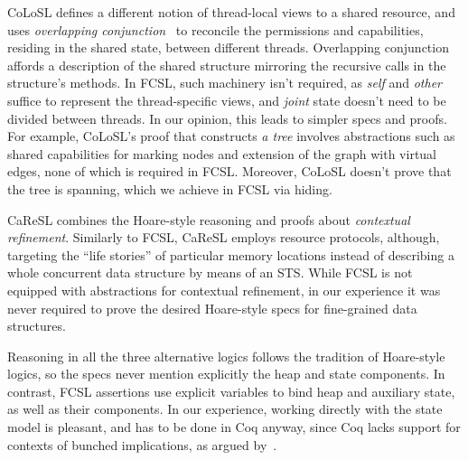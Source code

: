 CoLoSL defines a different notion of thread-local views to a shared
resource, and uses \emph{overlapping
  conjunction}~\cite{Hobor-Villard:POPL13} to reconcile the
permissions and capabilities, residing in the shared state, between
different threads.
%
Overlapping conjunction affords a description of the shared structure
mirroring the recursive calls in the structure's methods. In FCSL,
such machinery isn't required, as \emph{self} and \emph{other} suffice
to represent the thread-specific views, and \emph{joint} state doesn't
need to be divided between threads.
%
In our opinion, this leads to simpler specs and proofs. For example,
CoLoSL's proof that  constructs \emph{a tree} involves
abstractions such as shared capabilities for marking nodes and
extension of the graph with virtual edges, none of which is required
in FCSL. Moreover, CoLoSL doesn't prove that the tree is spanning,
which we achieve in FCSL via hiding.


CaReSL combines the Hoare-style reasoning and proofs about
\emph{contextual refinement}.  Similarly to FCSL, CaReSL employs
resource protocols, although, targeting the ``life stories'' of
particular memory locations instead of describing a whole concurrent
data structure by means of an STS.  While FCSL is not equipped with
abstractions for contextual refinement, in our experience it was never
required to prove the desired Hoare-style specs for fine-grained data
structures.

Reasoning in all the three alternative logics follows the tradition of
Hoare-style logics,
%
%
so the specs never mention explicitly the heap and state
components. In contrast, FCSL assertions use explicit variables to
bind heap and auxiliary state, as well as their components. In our
experience, working directly with the state model is pleasant, and has
to be done in Coq anyway, since Coq lacks support for contexts of
bunched implications, as argued by~\citet{Nanevski-al:POPL10}.

